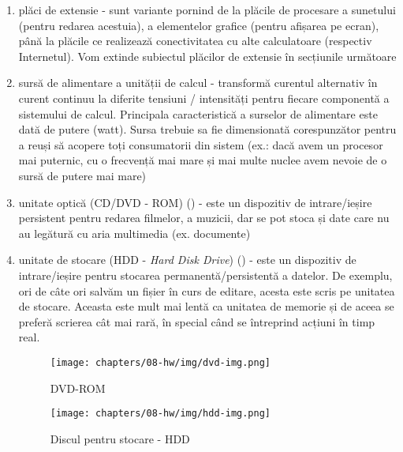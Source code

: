 \begin{enumerate}
  \item plăci de extensie - sunt variante pornind de la plăcile de
          procesare a sunetului (pentru redarea acestuia), a elementelor
          grafice (pentru afișarea pe ecran), până la plăcile ce realizează
          conectivitatea cu alte calculatoare (respectiv Internetul). Vom
          extinde subiectul plăcilor de extensie în secțiunile următoare
  \item sursă de alimentare a unității de calcul - transformă curentul
          alternativ în curent continuu la diferite tensiuni / intensități
          pentru fiecare componentă a sistemului de calcul. Principala
          caracteristică a surselor de alimentare este dată de putere
          (watt). Sursa trebuie sa fie dimensionată corespunzător pentru a
          reuși să acopere toți consumatorii din sistem (ex.: dacă avem un
          procesor mai puternic, cu o frecvență mai mare și mai multe
          nuclee avem nevoie de o sursă de putere mai mare)
        \item unitate optică (CD/DVD - ROM)  () -
          este un dispozitiv de intrare/ieșire persistent pentru
          redarea filmelor, a muzicii, dar se pot stoca și date care nu au
          legătură cu aria multimedia (ex. documente)

  \item unitate de stocare (HDD  - \textit{Hard Disk
    Drive}) () - este un dispozitiv de intrare/ieșire pentru
          stocarea permanentă/persistentă a datelor. De exemplu, ori de
          câte ori salvăm un fișier în curs de editare, acesta este scris
          pe unitatea de stocare. Aceasta este mult mai lentă ca unitatea
          de memorie și de aceea se preferă scrierea cât mai rară, în
          special când se întreprind acțiuni în timp real.


\begin{figure}[!htbp]
  \centering
  \texttt{[image: chapters/08-hw/img/dvd-img.png]}
  \caption{DVD-ROM\protect\footnotemark}
  \label{fig:hw:dvd}
\end{figure}

\begin{figure}[!htbp]
  \centering
  \texttt{[image: chapters/08-hw/img/hdd-img.png]}
  \caption{Discul pentru stocare - HDD\protect\footnotemark}
  \label{fig:hw:hdd}
\end{figure}


\end{enumerate}
